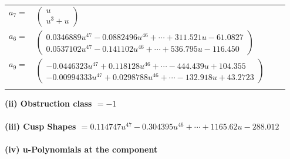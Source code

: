 \documentclass[1p]{elsarticle_modified}
\theoremstyle{definition}
\begin{document}
\begin{tabular}{m{7pt} m{180pt} m{7pt} m{180pt} }
\flushright $a_{7}=$&$\begin{pmatrix}u\\u^3+u\end{pmatrix}$ \\
\flushright $a_{6}=$&$\begin{pmatrix}0.0346889 u^{47}-0.0882496 u^{46}+\cdots+311.521 u-61.0827\\0.0537102 u^{47}-0.141102 u^{46}+\cdots+536.795 u-116.450\end{pmatrix}$ \\
\flushright $a_{9}=$&$\begin{pmatrix}-0.0446323 u^{47}+0.118128 u^{46}+\cdots-444.439 u+104.355\\-0.00994333 u^{47}+0.0298788 u^{46}+\cdots-132.918 u+43.2723\end{pmatrix}$\\&\end{tabular}
\flushleft \textbf{(ii) Obstruction class $= -1$}\\~\\
\flushleft \textbf{(iii) Cusp Shapes $= 0.114747 u^{47}-0.304395 u^{46}+\cdots+1165.62 u-288.012$}\\~\\
\newpage\renewcommand{\arraystretch}{1}
\flushleft \textbf{(iv) u-Polynomials at the component}\newline \\
\end{document}
